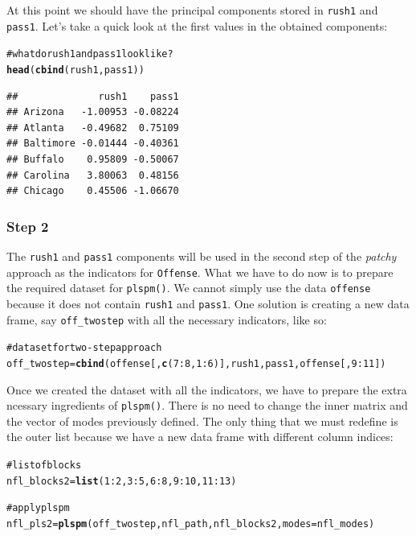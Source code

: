 \documentclass[12pt]{book}\usepackage{graphicx, color}
\makeatletter
\newcommand{\hlfunctioncall}[1]{\textcolor[rgb]{0.501960784313725,0,0.329411764705882}{\textbf{#1}}}%
\newcommand{\hlcomment}[1]{\textcolor[rgb]{0.180392156862745,0.6,0.341176470588235}{#1}}%
\newenvironment{kframe}{%
 \def\at@end@of@kframe{}%
 \ifinner\ifhmode%
  \def\at@end@of@kframe{\end{minipage}}%
  \begin{minipage}{\columnwidth}%
 \fi\fi%
 \def\FrameCommand##1{\hskip\@totalleftmargin \hskip-\fboxsep
 \colorbox{shadecolor}{##1}\hskip-\fboxsep
     \hskip-\linewidth \hskip-\@totalleftmargin \hskip\columnwidth}%
 \MakeFramed {\advance\hsize-\width
   \@totalleftmargin\z@ \linewidth\hsize
   \@setminipage}}%
 {\par\unskip\endMakeFramed%
 \at@end@of@kframe}
\newenvironment{knitrout}{}{} %
\newcommand{\fplspm}{\texttt{plspm()}}
\newcommand{\code}[1]{\texttt{#1}}
\makeatother
\begin{document}
At this point we should have the principal components stored in \code{rush1} and \code{pass1}. Let's take a quick look at the first values in the obtained components:
\begin{knitrout}
\color{fgcolor}\begin{kframe}
\begin{alltt}
\hlcomment{# what do rush1 and pass1 look like?}
\hlfunctioncall{head}(\hlfunctioncall{cbind}(rush1, pass1))
\end{alltt}
\begin{verbatim}
##              rush1    pass1
## Arizona   -1.00953 -0.08224
## Atlanta   -0.49682  0.75109
## Baltimore -0.01444 -0.40361
## Buffalo    0.95809 -0.50067
## Carolina   3.80063  0.48156
## Chicago    0.45506 -1.06670
\end{verbatim}
\end{kframe}
\end{knitrout}


\subsubsection*{Step 2}
The  \code{rush1} and \code{pass1} components will be used in the second step of the \textit{patchy} approach as the indicators for \code{Offense}. What we have to do now is to prepare the required dataset for \fplspm{}. We cannot simply use the data \code{offense} because it does not contain  \code{rush1} and \code{pass1}. One solution is creating a new data frame, say \code{off\_twostep} with all the necessary indicators, like so:
\begin{knitrout}
\color{fgcolor}\begin{kframe}
\begin{alltt}
\hlcomment{# dataset for two-step approach}
off_twostep = \hlfunctioncall{cbind}(offense[, \hlfunctioncall{c}(7:8, 1:6)], rush1, pass1, offense[, 9:11])
\end{alltt}
\end{kframe}
\end{knitrout}


Once we created the dataset with all the indicators, we have to prepare the extra ncessary ingredients of \fplspm{}. There is no need to change the inner matrix and the vector of modes previously defined. The only thing that we must redefine is the outer list because we have a new data frame with different column indices:
\begin{knitrout}
\color{fgcolor}\begin{kframe}
\begin{alltt}
\hlcomment{# list of blocks}
nfl_blocks2 = \hlfunctioncall{list}(1:2, 3:5, 6:8, 9:10, 11:13)

\hlcomment{# apply plspm}
nfl_pls2 = \hlfunctioncall{plspm}(off_twostep, nfl_path, nfl_blocks2, modes = nfl_modes)
\end{alltt}
\end{kframe}
\end{knitrout}
\end{document}
